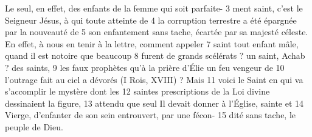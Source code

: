 Le seul, en effet, des enfants de la femme qui soit parfaite-	 
3	 	ment saint, c'est le Seigneur Jésus, à qui toute atteinte de	 
4	 	la corruption terrestre a été épargnée par la nouveauté de	 
5	 	son enfantement sans tache, écartée par sa majesté céleste.
En effet, à nous en tenir à la lettre, comment appeler	 
7	 	saint tout enfant mâle, quand il est notoire que beaucoup	 
8	 	furent de grands scélérats ? un saint, Achab ? des saints,	 
9	 	les faux prophètes qu'à la prière d'Élie un feu vengeur de	 
10	 	l'outrage fait au ciel a dévorés (I Rois, XVIII) ? Mais	 
11	 	voici le Saint en qui va s'accomplir le mystère dont les	 
12	 	saintes prescriptions de la Loi divine dessinaient la figure,	 
13	 	attendu que seul Il devait donner à l'Église, sainte et	 
14	 	Vierge, d'enfanter de son sein entrouvert, par une fécon-	 
15	 	dité sans tache, le peuple de Dieu.